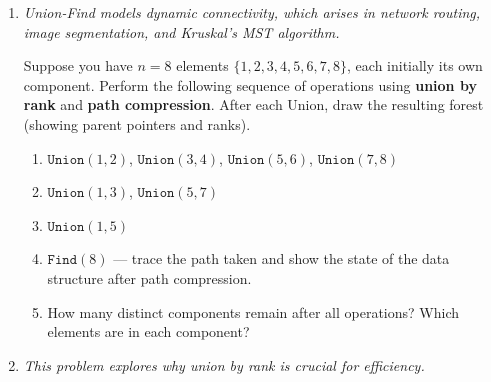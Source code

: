 \documentclass[9pt]{book}
\begin{document}
\begin{enumerate}[label=\arabic*.]
Consider a \textbf{weighted} activity selection problem. You have $n$ intervals, each with a start time $s_i$, finish time $f_i$, and weight $w_i$. You want to select a set of non-overlapping intervals with \textbf{maximum total weight}.

\begin{enumerate}
    \item Show that the greedy strategy ``always pick the non-overlapping interval with the smallest finish time'' fails for weighted intervals.
    \item Show that ``always pick the non-overlapping interval with the highest weight'' also fails.
    \item Show that ``always pick the non-overlapping interval with the best weight-to-duration ratio'' also fails. Provide a concrete counterexample for each.
\end{enumerate}


\item \textit{Union-Find models dynamic connectivity, which arises in network routing, image segmentation, and Kruskal's MST algorithm.}

Suppose you have $n = 8$ elements $\{1, 2, 3, 4, 5, 6, 7, 8\}$, each initially its own component. Perform the following sequence of operations using \textbf{union by rank} and \textbf{path compression}. After each Union, draw the resulting forest (showing parent pointers and ranks).

\begin{enumerate}
    \item $\texttt{Union}(1,2)$, $\texttt{Union}(3,4)$, $\texttt{Union}(5,6)$, $\texttt{Union}(7,8)$
    \item $\texttt{Union}(1,3)$, $\texttt{Union}(5,7)$
    \item $\texttt{Union}(1,5)$
    \item $\texttt{Find}(8)$ --- trace the path taken and show the state of the data structure after path compression.
    \item How many distinct components remain after all operations? Which elements are in each component?
\end{enumerate}

\item \textit{This problem explores why union by rank is crucial for efficiency.}


\end{enumerate}
\end{document}
